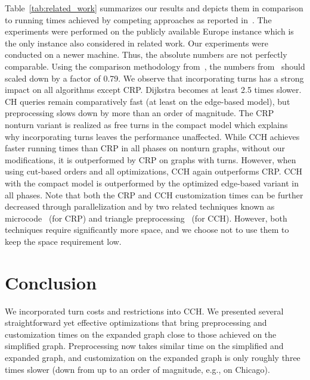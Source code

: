 \documentclass[a4paper, english, cleveref]{lipics-v2021}
\begin{document}
Table~\ref{tab:related_work} summarizes our results and depicts them in comparison to running times achieved by competing approaches as reported in~\cite{DellingGPW17}.
The experiments were performed on the publicly available Europe instance which is the only instance also considered in related work.
Our experiments were conducted on a newer machine.
Thus, the absolute numbers are not perfectly comparable.
Using the comparison methodology from~\cite{BastDGMPSWW16}, the numbers from~\cite{DellingGPW17} should scaled down by a factor of 0.79.
We observe that incorporating turns has a strong impact on all algorithms except CRP.
Dijkstra becomes at least 2.5 times slower.
CH queries remain comparatively fast (at least on the edge-based model), but preprocessing slows down by more than an order of magnitude.
The CRP nonturn variant is realized as free turns in the compact model which explains why incorporating turns leaves the performance unaffected.
While CCH achieves faster running times than CRP in all phases on nonturn graphs, without our modifications, it is outperformed by CRP on graphs with turns.
However, when using cut-based orders and all optimizations, CCH again outperforms CRP.
CCH with the compact model is outperformed by the optimized edge-based variant in all phases.
Note that both the CRP and CCH customization times can be further decreased through parallelization and by two related techniques known as microcode~\cite{DellingW13} (for CRP) and triangle preprocessing~\cite{DibbeltSW16} (for CCH).
However, both techniques require significantly more space, and we choose not to use them to keep the space requirement low.


\section{Conclusion}
\label{sec:conclusion}

We incorporated turn costs and restrictions into CCH. We presented several straightforward yet effective optimizations that bring preprocessing and customization times on the expanded graph close to those achieved on the simplified graph. Preprocessing now takes similar time on the simplified and expanded graph, and customization on the expanded graph is only roughly three times slower (down from up to an order of magnitude, e.g., on Chicago).
\end{document}
